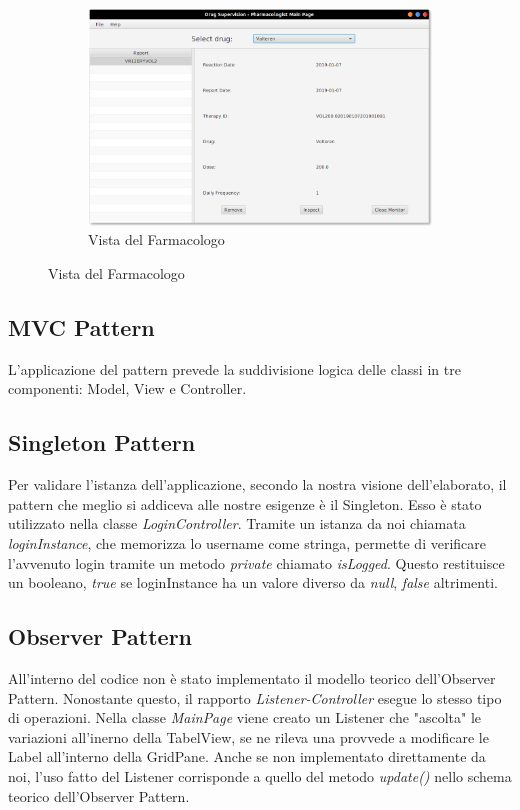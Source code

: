 \documentclass[a4paper, 11pt]{article}
\newcommand{\safeImage} [2] [\textwidth]{%
	\begin{figure}[H]
		\centering
		\IfFileExists{#2}{\texttt{[image: \#2]}}{\texttt{[image: example-image-a]}}
	\end{figure}
}
\begin{document}
\begin{figure}[H]
			\begin{subfigure}[h]{\textwidth}
				\centering
				\includegraphics[height=0.3\textheight]{Pharmacologist-view.png}
				\caption{Vista del Farmacologo}
			\end{subfigure}
		\end{figure}
	
		\subsection{MVC Pattern}
		L'applicazione del pattern prevede la suddivisione logica delle classi in tre componenti: Model, View e Controller. \newline
		
		\safeImage[0.6\textwidth]{MVC.png}
		
		\subsection{Singleton Pattern}
		Per validare l'istanza dell'applicazione, secondo la nostra visione dell'elaborato, il pattern che meglio si addiceva alle nostre esigenze è il Singleton. Esso è stato utilizzato nella classe \textit{LoginController}. Tramite un istanza da noi chiamata \textit{loginInstance}, che memorizza lo username come stringa, permette di verificare l'avvenuto login tramite un metodo \textit{private} chiamato \textit{isLogged}. Questo restituisce un booleano, \textit{true} se loginInstance  ha un valore diverso da \textit{null}, \textit{false} altrimenti.    
		
		\subsection{Observer Pattern}
		All'interno del codice non è stato implementato il modello teorico dell'Observer Pattern. Nonostante questo, il rapporto \textit{Listener-Controller} esegue lo stesso tipo di operazioni. Nella classe \textit{MainPage} viene creato un Listener che "ascolta" le variazioni all'inerno della TabelView, se ne rileva una provvede a modificare le Label all'interno della GridPane. Anche se non implementato direttamente da noi, l'uso fatto del Listener corrisponde a quello del metodo \textit{update()} nello schema teorico dell'Observer Pattern.
\end{document}
